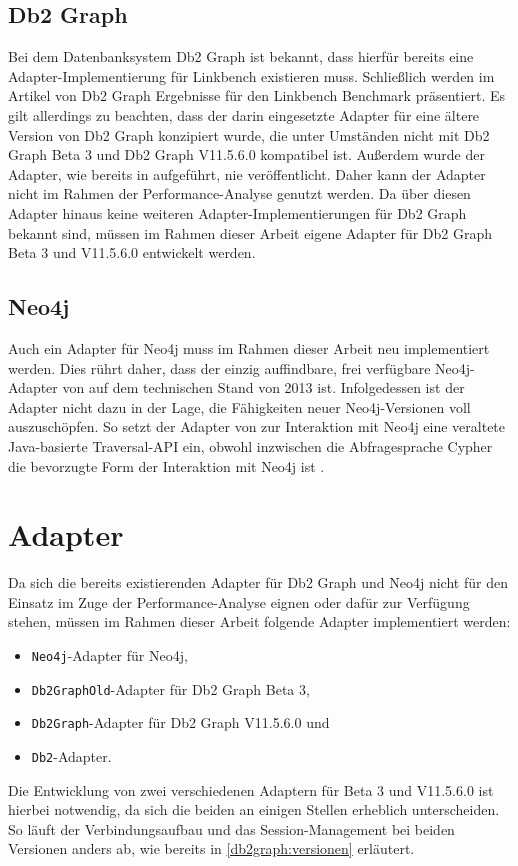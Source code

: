 \subsection{Db2 Graph}
\label{implementierung:evaluation:db2graph}
Bei dem Datenbanksystem Db2 Graph ist bekannt, dass hierfür bereits eine Adapter-Implementierung für Linkbench existieren muss. Schließlich werden im Artikel von  Db2 Graph Ergebnisse für den Linkbench Benchmark präsentiert. Es gilt allerdings zu beachten, dass der darin eingesetzte Adapter für eine ältere Version von Db2 Graph konzipiert wurde, die unter Umständen nicht mit Db2 Graph Beta 3 und Db2 Graph V11.5.6.0 kompatibel ist. Außerdem wurde der Adapter, wie bereits in  aufgeführt, nie veröffentlicht. Daher kann der Adapter nicht im Rahmen der Performance-Analyse genutzt werden. Da über diesen Adapter hinaus keine weiteren Adapter-Implementierungen für Db2 Graph bekannt sind, müssen im Rahmen dieser Arbeit eigene Adapter für Db2 Graph Beta 3 und V11.5.6.0 entwickelt werden. 

\subsection{Neo4j}
\label{implementierung:evaluation:neo4j}
Auch ein Adapter für Neo4j muss im Rahmen dieser Arbeit neu implementiert werden. Dies rührt daher, dass der einzig auffindbare, frei verfügbare Neo4j-Adapter von  auf dem technischen Stand von 2013 ist. Infolgedessen ist der Adapter nicht dazu in der Lage, die Fähigkeiten neuer Neo4j-Versionen voll auszuschöpfen. So setzt der Adapter von  zur Interaktion mit Neo4j eine veraltete Java-basierte Traversal-API ein, obwohl inzwischen die Abfragesprache Cypher die bevorzugte Form der Interaktion mit Neo4j ist \cite{gdbms}.

\section{Adapter}
\label{implementierung:adapter}
Da sich die bereits existierenden Adapter für Db2 Graph und Neo4j nicht für den Einsatz im Zuge der Performance-Analyse eignen oder dafür zur Verfügung stehen, müssen im Rahmen dieser Arbeit folgende Adapter implementiert werden:
\begin{itemize}
    \item \texttt{Neo4j}-Adapter für Neo4j,
    \item \texttt{Db2GraphOld}-Adapter für Db2 Graph Beta 3, 
    \item \texttt{Db2Graph}-Adapter für Db2 Graph V11.5.6.0 und
    \item \texttt{Db2}-Adapter.
\end{itemize}
Die Entwicklung von zwei verschiedenen Adaptern für Beta 3 und V11.5.6.0 ist hierbei notwendig, da sich die beiden an einigen Stellen erheblich unterscheiden. So läuft der Verbindungsaufbau und das Session-Management bei beiden Versionen anders ab, wie bereits in \autoref{db2graph:versionen} erläutert. 

